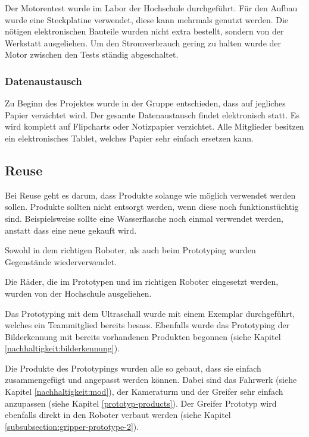 Der Motorentest wurde im Labor der Hochschule durchgeführt. Für den Aufbau wurde eine Steckplatine verwendet, diese kann mehrmals genutzt werden. Die nötigen elektronischen Bauteile wurden nicht extra bestellt, sondern von der Werkstatt ausgeliehen. Um den Stromverbrauch gering zu halten wurde der Motor zwischen den Tests ständig abgeschaltet. 

\subsubsection{Datenaustausch}

Zu Beginn des Projektes wurde in der Gruppe entschieden, dass auf jegliches Papier verzichtet wird. Der gesamte Datenaustausch findet elektronisch statt. Es wird komplett auf Flipcharts oder Notizpapier verzichtet. Alle Mitglieder besitzen ein elektronisches Tablet, welches Papier sehr einfach ersetzen kann.


\subsection{Reuse}\label{nachhaltigkeit:reuse}

Bei Reuse geht es darum, dass Produkte solange wie möglich verwendet werden sollen. Produkte sollten nicht entsorgt werden, wenn diese noch funktionstüchtig sind. Beispielsweise sollte eine Wasserflasche noch einmal verwendet werden, anstatt dass eine neue gekauft wird.

Sowohl in dem richtigen Roboter, als auch beim Prototyping wurden Gegenstände wiederverwendet.

Die Räder, die im Prototypen und im richtigen Roboter eingesetzt werden, wurden von der Hochschule ausgeliehen.

Das Prototyping mit dem Ultraschall wurde mit einem Exemplar durchgeführt, welches ein Teammitglied bereits besass. Ebenfalls wurde das Prototyping der Bilderkennung mit bereits vorhandenen Produkten begonnen (siehe Kapitel \ref{nachhaltigkeit:bilderkennung}).

Die Produkte des Prototypings wurden alle so gebaut, dass sie einfach zusammengefügt und angepasst werden können. Dabei sind das Fahrwerk (siehe Kapitel \ref{nachhaltigkeit:mod}), der Kameraturm und der Greifer sehr einfach anzupassen (siehe Kapitel \ref{prototyp-products}). Der Greifer Prototyp wird ebenfalls direkt in den Roboter verbaut werden (siehe Kapitel \ref{subsubsection:gripper-prototype-2}).


